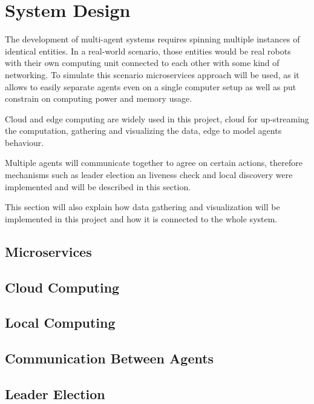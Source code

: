 \chapter{System Design}
The development of multi-agent systems requires spinning multiple instances of identical entities. In a real-world scenario, those entities would be real robots with their own computing unit connected to each other with some kind of networking. To simulate this scenario microservices approach will be used, as it allows to easily separate agents even on a single computer setup as well as put constrain on computing power and memory usage.

Cloud and edge computing are widely used in this project, cloud for up-streaming the computation, gathering and visualizing the data, edge to model agents behaviour.

Multiple agents will communicate together to agree on certain actions, therefore mechanisms such as leader election an liveness check and local discovery were implemented and will be described in this section.

This section will also explain how data gathering and visualization will be implemented in this project and how it is connected to the whole system.
\section{Microservices}


\section{Cloud Computing}


\section{Local Computing}


\section{Communication Between Agents}


\section{Leader Election}


